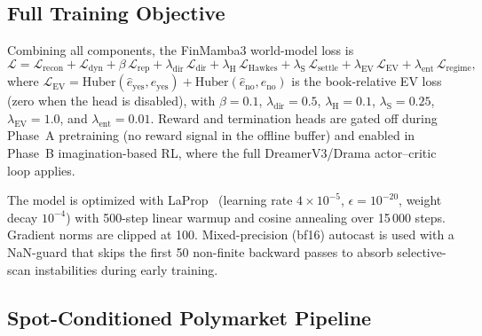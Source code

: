 \documentclass{article}
\begin{document}
\subsection{Full Training Objective}\label{sec:full_loss}

Combining all components, the FinMamba3 world-model loss is
\begin{equation}\label{eq:full_loss}
  \mathcal{L} =
  \mathcal{L}_{\text{recon}}
  + \mathcal{L}_{\text{dyn}}
  + \beta\,\mathcal{L}_{\text{rep}}
  + \lambda_{\text{dir}}\,\mathcal{L}_{\text{dir}}
  + \lambda_{\text{H}}\,\mathcal{L}_{\text{Hawkes}}
  + \lambda_{\text{S}}\,\mathcal{L}_{\text{settle}}
  + \lambda_{\text{EV}}\,\mathcal{L}_{\text{EV}}
  + \lambda_{\text{ent}}\,\mathcal{L}_{\text{regime}},
\end{equation}
where $\mathcal{L}_{\text{EV}} = \text{Huber}(\hat{e}_{\text{yes}},
e_{\text{yes}}) + \text{Huber}(\hat{e}_{\text{no}}, e_{\text{no}})$
is the book-relative EV loss (zero when the head is disabled),
with $\beta = 0.1$, $\lambda_{\text{dir}} = 0.5$,
$\lambda_{\text{H}} = 0.1$, $\lambda_{\text{S}} = 0.25$,
$\lambda_{\text{EV}} = 1.0$, and $\lambda_{\text{ent}} = 0.01$.  Reward and termination heads are gated
off during Phase~A pretraining (no reward signal in the offline buffer)
and enabled in Phase~B imagination-based RL, where the full
DreamerV3/Drama actor--critic loop applies.

The model is optimized with
LaProp~\citep{ziyin2021laprop} (learning rate $4 \times 10^{-5}$,
$\epsilon = 10^{-20}$, weight decay $10^{-4}$) with 500-step linear
warmup and cosine annealing over 15\,000 steps.  Gradient norms are
clipped at 100.  Mixed-precision (bf16) autocast is used with a NaN-guard
that skips the first 50 non-finite backward passes to absorb
selective-scan instabilities during early training.

\subsection{Spot-Conditioned Polymarket Pipeline}\label{sec:spot_pipeline}
\end{document}
